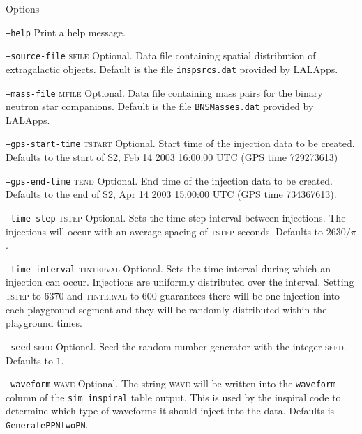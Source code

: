 \begin{entry}
\item[Options]\leavevmode
\begin{entry}
\item[\texttt{--help}] Print a help message.

\item[\texttt{--source-file} \textsc{sfile}]
Optional. Data file containing spatial distribution of  extragalactic  objects.
Default  is  the file \verb+inspsrcs.dat+ provided by LALApps.

\item[\texttt{--mass-file} \textsc{mfile}]
Optional. Data file containing mass pairs  for  the binary  neutron  star
companions.   Default is the file \verb+BNSMasses.dat+ provided by LALApps.

\item[\texttt{--gps-start-time} \textsc{tstart}]
Optional.  Start time of the injection data to be created. Defaults to the
start of S2, Feb 14 2003 16:00:00 UTC (GPS time 729273613)

\item[\texttt{--gps-end-time} \textsc{tend}]
Optional. End time of the injection data to be created. Defaults to the end of
S2, Apr 14 2003 15:00:00 UTC (GPS time 734367613).

\item[\texttt{--time-step} \textsc{tstep}]
Optional. Sets the time step interval between injections. The injections will
occur with an average spacing of \textsc{tstep} seconds. Defaults to 
$2630/\pi$.

\item[\texttt{--time-interval} \textsc{tinterval}]
Optional. Sets the time interval during which an injection can occur. 
Injections are uniformly distributed over the interval.  Setting \textsc{tstep}
to $6370$ and \textsc{tinterval} to 600 guarantees there will be one injection
into each playground segment and they will be randomly distributed within the
playground times.

\item[\texttt{--seed} \textsc{seed}]
Optional. Seed the random number generator with the integer \textsc{seed}.
Defaults to $1$.

\item[\texttt{--waveform} \textsc{wave}]
Optional. The string \textsc{wave} will be written into the \texttt{waveform}
column of the \texttt{sim\_inspiral} table output. This is used by the
inspiral code to determine which type of waveforms it should inject into the
data. Defaults is \texttt{GeneratePPNtwoPN}.


\end{entry}
\end{entry}
